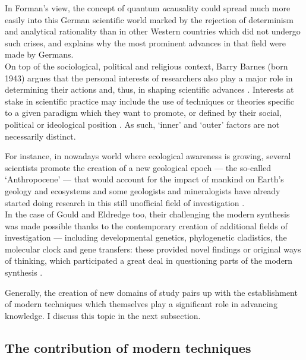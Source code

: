 In Forman's view, the concept of quantum \textit{a}causality could spread much more easily into this German scientific world marked by the rejection of determinism and analytical rationality than in other Western countries which did not undergo such crises, and explains why the most prominent advances in that field were made by Germans.\\

On top of the sociological, political and religious context, Barry Barnes (born 1943) argues that the personal interests of researchers also play a major role in determining their actions and, thus, in shaping scientific advances \citep{barnes1977interests}.
Interests at stake in scientific practice may include the use of techniques or theories specific to a given paradigm which they want to promote, or defined by their social, political or ideological position \citep{gingras2017determinants}.
As such, ‘inner’ and ‘outer’ factors are not necessarily distinct.

For instance, in nowadays world where ecological awareness is growing, several scientists promote the creation of a new geological epoch — the so-called ‘Anthropocene’ — that would account for the impact of mankind on Earth's geology and ecosystems \citep{crutzen2002geology} and some geologists and mineralogists have already started doing research in this still unofficial field of investigation \citep{corcoran2014anthropogenic,hazen2017mineralogy}.\\



In the case of Gould and Eldredge too, their challenging the modern synthesis was made possible thanks to the contemporary creation of additional fields of investigation — including developmental genetics, phylogenetic cladistics, the molecular clock and gene transfers: these provided novel findings or original ways of thinking, which participated a great deal in questioning parts of the modern synthesis \citep{lecointre2009apres}.

Generally, the creation of new domains of study pairs up with the establishment of modern techniques which themselves play a significant role in advancing knowledge. 
I discuss this topic in the next subsection. 




\subsection{The contribution of modern techniques}

